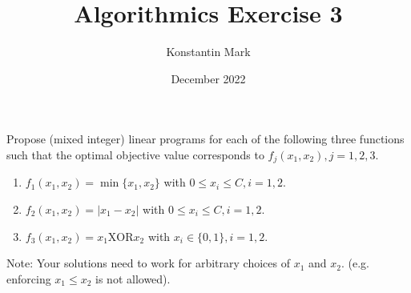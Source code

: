 \documentclass{article}
\title{Algorithmics Exercise 3}
\author{Konstantin Mark}
\date{December 2022}
\begin{document}
\maketitle


\listoftheorems[ignoreall,show={exercise}]

\newpage

\begin{exercise}[(MI)LP Modeling]
    Propose (mixed integer) linear programs for each of the following three functions such that the optimal objective value corresponds to $f_j(x_1,x_2), j = 1, 2, 3$. \begin{enumerate}
        \item $f_1(x_1, x_2) = \min \{x_1,x_2\}$ with $0\leq x_i\leq C, i = 1,2$.
        \item $f_2(x_1,x_2) = |x_1 - x_2|$ with $0\leq x_i\leq C, i = 1,2$.
        \item $f_3(x_1,x_2) = x_1\mathrm{XOR} x_2$ with $x_i \in \{0,1\}, i=1,2$.
    \end{enumerate}
    Note: Your solutions need to work for arbitrary choices of $x_1$ and $x_2$. (e.g. enforcing $x_1\leq x_2$ is not allowed).
\end{exercise}
\end{document}
